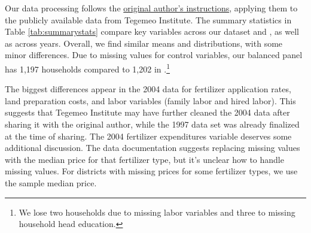 \documentclass[12pt]{article}
\theoremstyle{plain}
\theoremstyle{definition}
\begin{document}
\renewcommand{\thesubfigure}{\Alph{section}.\arabic{subfigure}}
\captionsetup[subfigure]{labelformat=simple, labelsep=colon}
\setcounter{subfigure}{0}

Our data processing follows the \href{https://www.dropbox.com/s/nnylv1yqwonffog/Data%20Documentation%20for%20Suri%202011.pdf?e=1&dl=0}{original author's instructions}, applying them to the publicly available data from Tegemeo Institute.
The summary statistics in Table \ref{tab:summarystats} compare key variables across our dataset and \citet{S2011}, as well as across years.
Overall, we find similar means and distributions, with some minor differences.
Due to missing values for control variables, our balanced panel has 1,197 households compared to 1,202 in \citet{S2011}.\footnote{We lose two households due to missing labor variables and three to missing household head education.}

The biggest differences appear in the 2004 data for fertilizer application rates, land preparation costs, and labor variables (family labor and hired labor).
This suggests that Tegemeo Institute may have further cleaned the 2004 data after sharing it with the original author, while the 1997 data set was already finalized at the time of sharing.
The 2004 fertilizer expenditures variable deserves some additional discussion.
The data documentation suggests replacing missing values with the median price for that fertilizer type, but it's unclear how to handle missing values.
For districts with missing prices for some fertilizer types, we use the sample median price.

\end{document}
